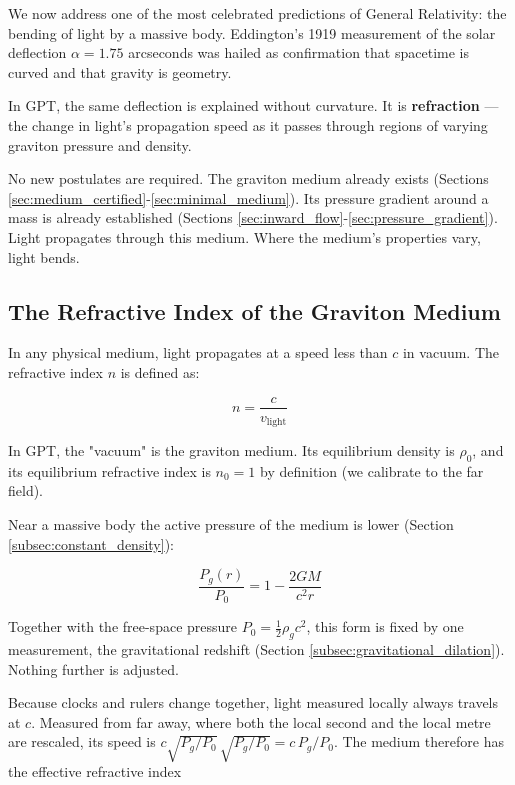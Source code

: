 \documentclass[12pt, a4paper]{article}
\begin{document}
We now address one of the most celebrated predictions of General Relativity: the bending of light by a massive body. Eddington's 1919 measurement of the solar deflection \( \alpha = 1.75 \) arcseconds was hailed as confirmation that spacetime is curved and that gravity is geometry.

In GPT, the same deflection is explained without curvature. It is \textbf{refraction} — the change in light's propagation speed as it passes through regions of varying graviton pressure and density.

No new postulates are required. The graviton medium already exists (Sections \ref{sec:medium_certified}-\ref{sec:minimal_medium}). Its pressure gradient around a mass is already established (Sections \ref{sec:inward_flow}-\ref{sec:pressure_gradient}). Light propagates through this medium. Where the medium's properties vary, light bends.

\subsection{The Refractive Index of the Graviton Medium}
\label{subsec:refractive_index}

In any physical medium, light propagates at a speed less than \( c \) in vacuum. The refractive index \( n \) is defined as:

\[
n = \frac{c}{v_{\text{light}}}
\]

In GPT, the "vacuum" is the graviton medium. Its equilibrium density is \( \rho_0 \), and its equilibrium refractive index is \( n_0 = 1 \) by definition (we calibrate to the far field).

Near a massive body the active pressure of the medium is lower (Section \ref{subsec:constant_density}):

\[
\frac{P_g(r)}{P_0} = 1 - \frac{2GM}{c^2 r}
\]

 Together with the free-space pressure \( P_0 = \tfrac{1}{2}\rho_g c^2 \), this form is fixed by one measurement, the gravitational redshift (Section \ref{subsec:gravitational_dilation}). Nothing further is adjusted.

Because clocks and rulers change together, light measured locally always travels at \( c \). Measured from far away, where both the local second and the local metre are rescaled, its speed is \( c\sqrt{P_g/P_0}\,\sqrt{P_g/P_0} = c\,P_g/P_0 \). The medium therefore has the effective refractive index
\end{document}
